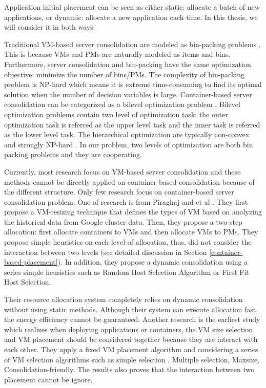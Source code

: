 Application initial placement can be seen as either static: allocate a batch of new applications, or dynamic: allocate a new application each time. In this thesis, we will consider it in both ways.

Traditional VM-based server consolidation are modeled as bin-packing problems \cite{Mann:2015ua}. This is because VMs and PMs are naturally modeled as items and bins. Furthermore, server consolidation and bin-packing have the same optimization objective: minimize the number of bins/PMs. The complexity of bin-packing problem is NP-hard which means it is extreme time-consuming to find its optimal solution when the number of decision variables is large. Container-based server consolidation can be categorized as a bilevel optimization problem \cite{Colson:2007bu}. Bilevel optimization problems contain two level of optimization task: the outer optimization task is referred as the upper level task and the inner task is referred as the lower level task. The hierarchical optimization are typically non-convex and strongly NP-hard \cite{Vicente:1994ie}. In our problem, two levels of optimization are both bin packing problems and they are cooperating.

Currently, most research focus on VM-based server consolidation and these methods cannot be directly applied on container-based consolidation because of the different structure. Only few research focus on container-based server consolidation problem. One of  research is from Piraghaj and et al \cite{Piraghaj:2015uf}. They first propose a VM-resizing technique that defines the types of VM based on analyzing the historical data from Google cluster data. Then, they propose a two-step allocation: first allocate containers to VMs and then allocate VMs to PMs. They propose simple heuristics on each level of allocation, thus, did not consider the interaction between two levels (see detailed discussion in Section \ref{container-based-placement}). In addition, they propose a dynamic consolidation \cite{Piraghaj:2016bw} using a series simple heuristics such as Random Host Selection Algorithm or First Fit Host Selection. 


Their resource allocation system completely relies on dynamic consolidation without using static methods. Although their system can execute allocation fast, the energy efficiency cannot be guaranteed. Another research  \cite{Mann:2016hx} is the earliest study which realizes when deploying applications or containers, the VM size selection and VM placement should be considered together because they are interact with each other. They apply a fixed VM placement algorithm and considering a series of VM selection algorithms such as simple selection \cite{Ganesan:2012eb},  Multiple selection, Maxsize, Consolidation-friendly. The results also proves that the interaction between two placement cannot be ignore.



